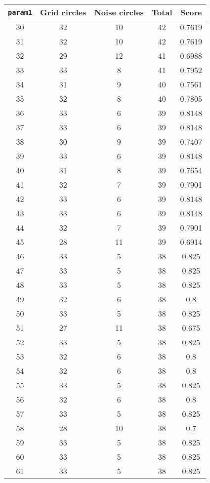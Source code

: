 \documentclass[letterpaper, 12pt]{article}
\begin{document}
\begin{longtable}{|c|c|c|c|c|}
\hline
\textbf{\texttt{param1}} & \textbf{Grid circles} & \textbf{Noise circles} & \textbf{Total} & \textbf{Score} \\
\hline
30 & 32 & 10 & 42 & 0.7619 \\
\hline
31 & 32 & 10 & 42 & 0.7619 \\
\hline
32 & 29 & 12 & 41 & 0.6988 \\
\hline
33 & 33 & 8 & 41 & 0.7952 \\
\hline
34 & 31 & 9 & 40 & 0.7561 \\
\hline
35 & 32 & 8 & 40 & 0.7805 \\
\hline
36 & 33 & 6 & 39 & 0.8148 \\
\hline
37 & 33 & 6 & 39 & 0.8148 \\
\hline
38 & 30 & 9 & 39 & 0.7407 \\
\hline
39 & 33 & 6 & 39 & 0.8148 \\
\hline
40 & 31 & 8 & 39 & 0.7654 \\
\hline
41 & 32 & 7 & 39 & 0.7901 \\
\hline
42 & 33 & 6 & 39 & 0.8148 \\
\hline
43 & 33 & 6 & 39 & 0.8148 \\
\hline
44 & 32 & 7 & 39 & 0.7901 \\
\hline
45 & 28 & 11 & 39 & 0.6914 \\
\hline
46 & 33 & 5 & 38 & 0.825 \\
\hline
47 & 33 & 5 & 38 & 0.825 \\
\hline
48 & 33 & 5 & 38 & 0.825 \\
\hline
49 & 32 & 6 & 38 & 0.8 \\
\hline
50 & 33 & 5 & 38 & 0.825 \\
\hline
51 & 27 & 11 & 38 & 0.675 \\
\hline
52 & 33 & 5 & 38 & 0.825 \\
\hline
53 & 32 & 6 & 38 & 0.8 \\
\hline
54 & 32 & 6 & 38 & 0.8 \\
\hline
55 & 33 & 5 & 38 & 0.825 \\
\hline
56 & 32 & 6 & 38 & 0.8 \\
\hline
57 & 33 & 5 & 38 & 0.825 \\
\hline
58 & 28 & 10 & 38 & 0.7 \\
\hline
59 & 33 & 5 & 38 & 0.825 \\
\hline
60 & 33 & 5 & 38 & 0.825 \\
\hline
61 & 33 & 5 & 38 & 0.825 \\

\end{longtable}
\end{document}
